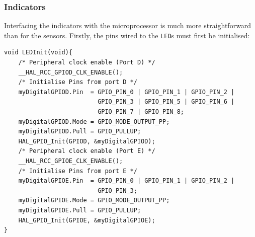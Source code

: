 \documentclass[12pt]{article}
\begin{document}
\subsubsection{Indicators}
Interfacing the indicators with the microprocessor is much more straightforward than for the sensors. Firstly, the pins wired to the \texttt{LED}s must first be initialised:
\begin{verbatim}
void LEDInit(void){
    /* Peripheral clock enable (Port D) */
    __HAL_RCC_GPIOD_CLK_ENABLE();
    /* Initialise Pins from port D */
    myDigitalGPIOD.Pin  = GPIO_PIN_0 | GPIO_PIN_1 | GPIO_PIN_2 |
                          GPIO_PIN_3 | GPIO_PIN_5 | GPIO_PIN_6 |
                          GPIO_PIN_7 | GPIO_PIN_8;			 
    myDigitalGPIOD.Mode = GPIO_MODE_OUTPUT_PP;
    myDigitalGPIOD.Pull = GPIO_PULLUP;
    HAL_GPIO_Init(GPIOD, &myDigitalGPIOD);
    /* Peripheral clock enable (Port E) */
    __HAL_RCC_GPIOE_CLK_ENABLE();	
    /* Initialise Pins from port E */
    myDigitalGPIOE.Pin  = GPIO_PIN_0 | GPIO_PIN_1 | GPIO_PIN_2 |
                          GPIO_PIN_3;			 
    myDigitalGPIOE.Mode = GPIO_MODE_OUTPUT_PP;
    myDigitalGPIOE.Pull = GPIO_PULLUP;
    HAL_GPIO_Init(GPIOE, &myDigitalGPIOE);
}
\end{verbatim}
\end{document}
